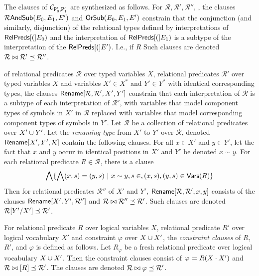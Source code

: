 The clauses of $\mathcal{C}_{ \cc{P}_0', \cc{P}_1' }$ are synthesized
as follows.
For $\mathcal{R}, \mathcal{R}', \mathcal{R}''$,
%
%
, the
clauses $\mathcal{R}\andsub(E_0, E_1, E')$ and $\orsub(E_0, E_1, E')$ constrain
that the conjunction (and similarly, disjunction) of the relational
types defined by interpretations of $\symrelpreds(E_0)$ and the
interpretation of $\symrelpreds(E_1)$ is a subtype of the
interpretation of the $\symrelpreds(E')$.
%
I.e., if $R$
%
%
Such clauses are denoted $\mathcal{R} \joinctr \mathcal{R}' \subtype
\mathcal{R}''$.

%
of relational predicates $\mathcal{R}$ over typed variables $X$,
relational predicates $\mathcal{R}'$ over typed variables $X$ and
variables $X' \in X^{*}$ and $Y' \in Y^{*}$ with identical
corresponding types, the clauses $\renamesub{ \mathcal{R} }{
  \mathcal{R'} }{ X' }{ Y' }$ constrain that each interpretation of
$\mathcal{R}$ is a subtype of each interpretation of $\mathcal{R}'$,
with variables that model component types of symbols in $X'$ in
$\mathcal{R}$ replaced with variables that model corresponding
component types of symbols in $Y'$.
%
Let $\mathcal{R}$ be a collection of relational predicates over $X'
\union Y'$.
%
Let the \emph{renaming type} from $X'$ to $Y'$ over $\mathcal{R}$,
denoted $\renameclauses{ X' }{ Y' }{ \mathcal{R} }$ contain the
following clauses.
%
For all $x \in X'$ and $y \in Y'$, let the fact that $x$ and $y$ occur
in identical positions in $X'$ and $Y'$ be denoted $x \sim y$.
%
For each relational predicate $R \in \mathcal{R}$, there is a clause 
%
\[ \bigland \setformer{ \bigland (x, s) = (y, s) }{ %
  x \sim y, s \in , (x, s), (y, s) \in \vars(R)}
\]
%
Then for relational predicates $\mathcal{R}''$ of $X'$ and $Y'$,
$\renamesub{ \mathcal{R} }{ \mathcal{R}' }{ x }{ y }$ consists of the
clauses $\renameclauses{X'}{Y'}{ \mathcal{R}''}$ and $\mathcal{R}
\joinctr \mathcal{R}'' \subtype \mathcal{R}'$.
%
Such clauses are denoted $\replace{ \mathcal{R} }{ X' }{ Y' } \subtype
\mathcal{R}'$.

For relational predicate $R$ over logical variables $X$, %
relational predicate $R'$ over logical vocabulary $X'$ and constraint
$\varphi$ over $X \union X'$, the \emph{constraint clauses} of $R$,
$R'$, and $\varphi$ is defined as follows.
%
Let $R_{\varphi}$ be a fresh relational predicate over logical
vocabulary $X \union X'$.
%
Then the constraint clauses consist of
$\varphi \entails R(X \concat X')$ and %
$\mathcal{R} \joinctr [ R ] \subtype \mathcal{R}'$.
%
The clauses are denoted $\ctrclause{ \mathcal{R} }{ \varphi }{
  \mathcal{R}' }$.

